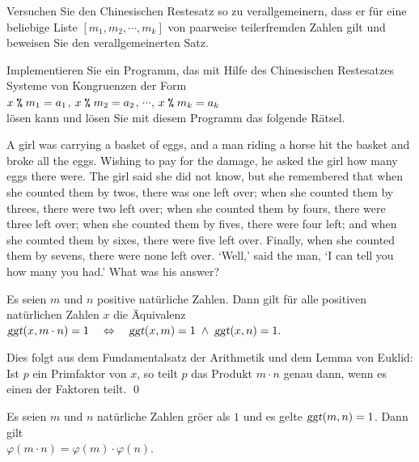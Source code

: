 \exercise
Versuchen Sie den Chinesischen Restesatz so zu verallgemeinern, dass er f\"{u}r eine beliebige
Liste $[m_1, m_2, \cdots, m_k]$ von paarweise teilerfremden Zahlen gilt und beweisen
Sie den verallgemeinerten Satz.

\exercise
Implementieren Sie ein Programm, das mit Hilfe des Chinesischen Restesatzes Systeme von
Kongruenzen der Form
\\[0.2cm]
\hspace*{1.3cm}
$x \;\texttt{\%}\; m_1 = a_1$, 
$x \;\texttt{\%}\; m_2 = a_2$, $\cdots$,
$x \;\texttt{\%}\; m_k = a_k$
\\[0.2cm]
l\"{o}sen kann und l\"{o}sen Sie mit diesem Programm das folgende R\"{a}tsel.
\vspace*{0.2cm}

\begin{minipage}[t]{0.9\linewidth}
  A girl was carrying a basket of eggs, and a man riding a horse hit
  the basket and broke all the eggs. Wishing to pay for the damage, he
  asked the girl how many eggs there were. The girl said she did not
  know, but she remembered that when she counted them by twos, there
  was one left over; when she counted them by threes, there were two
  left over; when she counted them by fours, there were three left
  over; when she counted them by fives, there were four left; and when
  she counted them by sixes, there were five left over. Finally, when
  she counted them by sevens, there were none left over. `Well,' said
  the man, `I can tell you how many you had.' What was his answer?
\end{minipage}

\begin{Satz} \label{satz:china3}
  Es seien $m$ und $n$ positive nat\"{u}rliche Zahlen.
  Dann gilt f\"{u}r alle positiven nat\"{u}rlichen Zahlen $x$ die \"{A}quivalenz
  \\[0.2cm]
  \hspace*{1.3cm}
  $\textsl{ggt}(x, m \cdot n) = 1 \quad \Leftrightarrow \quad
   \textsl{ggt}(x, m) = 1 \;\wedge\; \textsl{ggt}(x, n) = 1.
  $
\end{Satz}

\proof
Dies folgt aus dem Fundamentalsatz der Arithmetik und dem Lemma von Euklid: Ist $p$ ein
Primfaktor von $x$, so teilt $p$ das Produkt $m \cdot n$ genau dann, wenn es einen der
Faktoren teilt. \qed



\begin{Satz} \lb
  Es seien $m$ und $n$ nat\"{u}rliche Zahlen gr\"{o}\3er als $1$ und es gelte $\textsl{ggt}(m,n) = 1$.
  Dann gilt
  \\[0.2cm]
  \hspace*{1.3cm}
  $\varphi(m \cdot n) = \varphi(m) \cdot \varphi(n)$.
\end{Satz}

